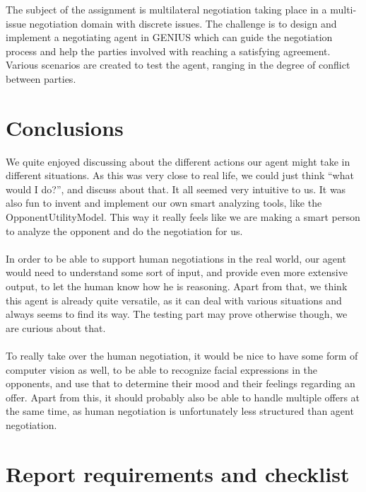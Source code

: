 \documentclass[11pt,a4paper]{article}
\begin{document}
The subject of the assignment is multilateral negotiation taking place in a multi-issue negotiation domain with discrete issues. The challenge is to design and implement a negotiating agent in GENIUS which can guide the negotiation process and help the parties involved with reaching a satisfying agreement. Various scenarios are created to test the agent, ranging in the degree of conflict between parties.\\



\newpage







\section{Conclusions}

We quite enjoyed discussing about the different actions our agent might take in different situations. As this was very close to real life, we could just think ``what would I do?'', and discuss about that. It all seemed very intuitive to us. It was also fun to invent and implement our own smart analyzing tools, like the OpponentUtilityModel. This way it really feels like we are making a smart person to analyze the opponent and do the negotiation for us.
\\\\
In order to be able to support human negotiations in the real world, our agent would need to understand some sort of input, and provide even more extensive output, to let the human know how he is reasoning. Apart from that, we think this agent is already quite versatile, as it can deal with various situations and always seems to find its way. The testing part may prove otherwise though, we are curious about that.
\\\\
To really take over the human negotiation, it would be nice to have some form of computer vision as well, to be able to recognize facial expressions in the opponents, and use that to determine their mood and their feelings regarding an offer. Apart from this, it should probably also be able to handle multiple offers at the same time, as human negotiation is unfortunately less structured than agent negotiation.

\newpage

\section*{Report requirements and checklist}
\end{document}

